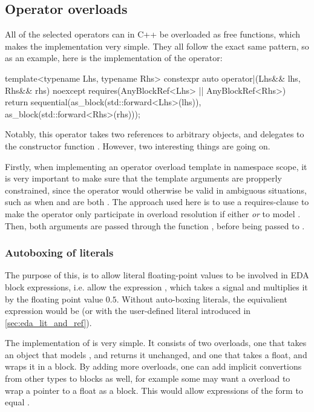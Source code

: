 \subsection{Operator overloads}

All of the selected operators can in C++ be overloaded as free functions, which makes the implementation very
simple. They all follow the exact same pattern, so as an example, here is the implementation of the
\oper{|} operator:

\begin{cppcodenl}
  template<typename Lhs, typename Rhs>
  constexpr auto operator|(Lhs&& lhs, Rhs&& rhs) noexcept
  requires(AnyBlockRef<Lhs> || AnyBlockRef<Rhs>)
  {
    return sequential(as_block(std::forward<Lhs>(lhs)), as_block(std::forward<Rhs>(rhs)));
  }
\end{cppcodenl}

Notably, this operator takes two references to arbitrary objects, and delegates to the constructor function
. However, two interesting things are going on.

Firstly, when implementing an operator overload template in namespace scope, it is very important to make
sure that the template arguments are propperly constrained, since the operator would otherwise be valid in
ambiguous situations, such as when  and  are both . The approach
used here is to use a requires-clause to make the operator only participate in overload resolution if either
 \emph{or}  to model . Then, both arguments are passed through the
function
, before being passed to .

\subsubsection{Autoboxing of literals}

The purpose of this, is to allow literal floating-point values to be involved in EDA block expressions, i.e.
allow the expression , which takes a signal and multiplies it by the floating point
value $0.5$. Without auto-boxing literals, the equivalient expression would be
 (or  with the user-defined literal introduced in \autoref{sec:eda_lit_and_ref}).

The implementation of  is very simple. It consists of two overloads, one that takes an
object that models , and returns it unchanged, and one that takes a float, and wraps
it in a  block. By adding more  overloads, one can add implicit convertions from other types to
blocks as well, for example some may want a  overload to wrap a pointer to a float as a  block. This would allow expressions
of the form  to equal .

